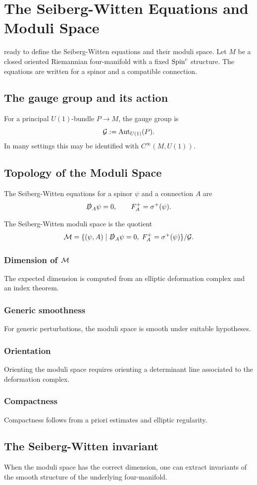 \chapter{The Seiberg-Witten Equations and Moduli Space}

 ready to define the Seiberg-Witten equations and their moduli space. Let $M$ be a closed oriented Riemannian four-manifold with a fixed $\operatorname{Spin}^{c}$ structure. The equations are written for a spinor and a compatible connection.

\section{The gauge group and its action}
\begin{definition}
For a principal $U(1)$-bundle $P\to M$, the gauge group is
\[
  \mathcal{G} := \operatorname{Aut}_{U(1)}(P).
\]
In many settings this may be identified with $C^\infty(M,U(1))$.
\end{definition}

\section{Topology of the Moduli Space}
\begin{definition}
The Seiberg-Witten equations for a spinor $\psi$ and a connection $A$ are
\[
  \slashed{D}_A\psi=0,
  \qquad
  F_A^+ = \sigma^+(\psi).
\]
\end{definition}

\begin{definition}
The Seiberg-Witten moduli space is the quotient
\[
\mathcal{M} = \{(\psi,A)\mid \slashed{D}_A\psi=0,\;F_A^+=\sigma^+(\psi)\}/\mathcal{G}.
\]
\end{definition}

\subsection{Dimension of $\mathcal{M}$}
The expected dimension is computed from an elliptic deformation complex and an index theorem.

\subsection{Generic smoothness}
For generic perturbations, the moduli space is smooth under suitable hypotheses.

\subsection{Orientation}
Orienting the moduli space requires orienting a determinant line associated to the deformation complex.

\subsection{Compactness}
Compactness follows from a priori estimates and elliptic regularity.

\section{The Seiberg-Witten invariant}
When the moduli space has the correct dimension, one can extract invariants of the smooth structure of the underlying four-manifold.
